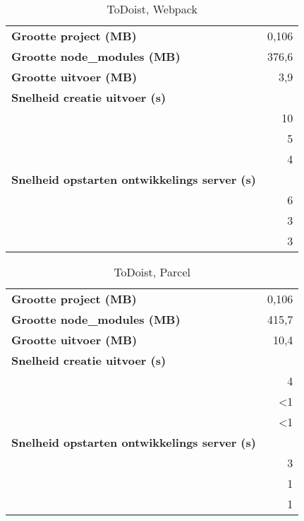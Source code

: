 \begin{table}[h]
    \centering
    \begin{tabular}{lr}
    \textbf{Grootte project (MB)} & 0,106 \\
    \textbf{Grootte node\_modules (MB)} & 376,6 \\
    \textbf{Grootte uitvoer (MB)} & 3,9 \\
    \textbf{Snelheid creatie uitvoer (s)} &\\
    \textbf{} & 10 \\
    \textbf{} & 5 \\
    \textbf{} & 4 \\
    \textbf{Snelheid opstarten ontwikkelings server (s)} & \\
    \textbf{} & 6 \\
    \textbf{} & 3 \\
    \textbf{} & 3
    \end{tabular}
    \caption{ToDoist, Webpack}
    \end{table}

    \begin{table}[h]
        \centering
        \begin{tabular}{lr}
        \textbf{Grootte project (MB)} & 0,106 \\
        \textbf{Grootte node\_modules (MB)} & 415,7 \\
        \textbf{Grootte uitvoer (MB)} & 10,4 \\
        \textbf{Snelheid creatie uitvoer (s)} & \\
        \textbf{} & 4 \\
        \textbf{} & <1 \\
        \textbf{} & <1 \\
        \textbf{Snelheid opstarten ontwikkelings server (s)} & \\
        \textbf{} & 3 \\
        \textbf{} & 1 \\
        \textbf{} & 1
        \end{tabular}
        \caption{ToDoist, Parcel}
        \end{table}

